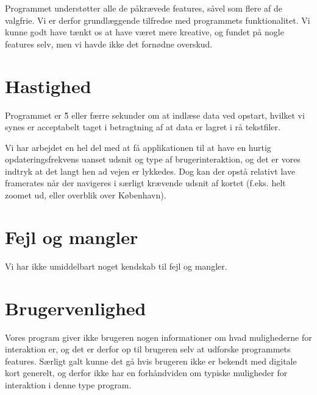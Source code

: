 Programmet understøtter alle de påkrævede features, såvel som flere af de valgfrie. Vi er derfor grundlæggende tilfredse med programmets funktionalitet. Vi kunne godt have tænkt os at have været mere kreative, og fundet på nogle features selv, men vi havde ikke det fornødne overskud.

\section{Hastighed}

Programmet er \~5 eller færre sekunder om at indlæse data ved opstart, hvilket vi synes er acceptabelt taget i betragtning af at data er lagret i rå tekstfiler.

Vi har arbejdet en hel del med at få applikationen til at have en hurtig opdateringsfrekvens uanset udsnit og type af brugerinteraktion, og det er vores indtryk at det langt hen ad vejen er lykkedes. Dog kan der opstå relativt lave framerates når der navigeres i særligt krævende udsnit af kortet (f.eks. helt zoomet ud, eller overblik over København).

\section{Fejl og mangler}

Vi har ikke umiddelbart noget kendskab til fejl og mangler.

\section{Brugervenlighed}

Vores program giver ikke brugeren nogen informationer om hvad mulighederne for interaktion er, og det er derfor op til brugeren selv at udforske programmets features. Særligt galt kunne det gå hvis brugeren ikke er bekendt med digitale kort generelt, og derfor ikke har en forhåndviden om typiske muligheder for interaktion i denne type program.